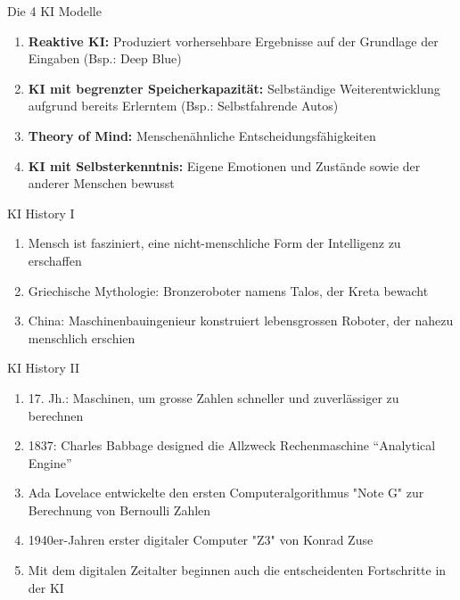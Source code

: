 \begin{frame}{Die 4 KI Modelle}
    \begin{bee}
        \begin{enumerate}[$\bullet$]
            \item \textbf{Reaktive KI:} Produziert vorhersehbare Ergebnisse auf der Grundlage der Eingaben (Bsp.: Deep Blue)
            \item \textbf{KI mit begrenzter Speicherkapazität:} Selbständige Weiterentwicklung aufgrund bereits Erlerntem (Bsp.: Selbstfahrende Autos)
            \item \textbf{Theory of Mind:} Menschenähnliche Entscheidungsfähigkeiten
            \item \textbf{KI mit Selbsterkenntnis:} Eigene Emotionen und Zustände sowie der anderer Menschen bewusst
        \end{enumerate}
    \end{bee}
\end{frame}

\begin{frame}{KI History I}
    \begin{bee}[Frühgeschichte]
        \begin{enumerate}[$\bullet$]
            \item Mensch ist fasziniert, eine nicht-menschliche Form der Intelligenz zu erschaffen
            \item Griechische Mythologie: Bronzeroboter namens Talos, der Kreta bewacht
            \item China: Maschinenbauingenieur konstruiert lebensgrossen Roboter, der nahezu menschlich erschien
        \end{enumerate}
    \end{bee}
\end{frame}

\begin{frame}{KI History II}
    \begin{bee}
        \begin{enumerate}[$\bullet$]
            \item 17. Jh.: Maschinen, um grosse Zahlen schneller und zuverlässiger zu berechnen
            \item 1837: Charles Babbage designed die Allzweck Rechenmaschine “Analytical Engine”
            \item Ada Lovelace entwickelte den ersten Computeralgorithmus "Note G" zur Berechnung von Bernoulli Zahlen
            \item 1940er-Jahren erster digitaler Computer "Z3" von Konrad Zuse
           \item Mit dem digitalen Zeitalter beginnen auch die entscheidenten Fortschritte in der KI
        \end{enumerate}
    \end{bee}
\end{frame}

